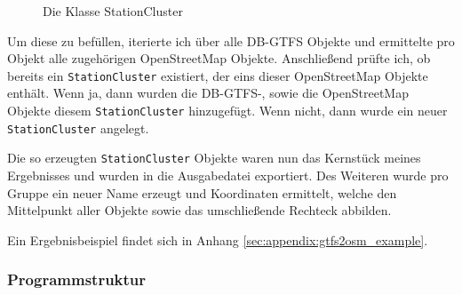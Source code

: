 \begin{figure}[htb]
   \centering
   \caption{Die Klasse StationCluster}
   \label{fig:gtfs2osm:stationcluster}
 \end{figure}

Um diese zu befüllen, iterierte ich über alle DB-GTFS Objekte und ermittelte pro Objekt alle zugehörigen OpenStreetMap Objekte.
Anschließend prüfte ich, ob bereits ein \texttt{StationCluster} existiert, der eins dieser OpenStreetMap Objekte enthält.
Wenn ja, dann wurden die DB-GTFS-, sowie die OpenStreetMap Objekte diesem \texttt{StationCluster} hinzugefügt.
Wenn nicht, dann wurde ein neuer \texttt{StationCluster} angelegt.

Die so erzeugten \texttt{StationCluster} Objekte waren nun das Kernstück meines Ergebnisses und wurden in die Ausgabedatei exportiert. Des Weiteren wurde pro Gruppe ein neuer Name erzeugt und Koordinaten ermittelt, welche den Mittelpunkt aller Objekte sowie das umschließende Rechteck abbilden.

Ein Ergebnisbeispiel findet sich in Anhang \ref{sec:appendix:gtfs2osm_example}.

\subsubsection{Programmstruktur}

